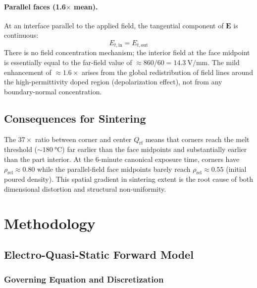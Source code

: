 \documentclass[5p,times]{elsarticle}
\newcommand{\Qrf}{Q_{\mathrm{rf}}}
\newcommand{\rhorel}{\rho_{\mathrm{rel}}}
\newcommand{\vect}[1]{\boldsymbol{#1}}
\begin{document}
\paragraph{Parallel faces (1.6$\times$ mean).}
At an interface parallel to the applied field, the tangential component
of $\vect{E}$ is continuous:
\begin{equation}
  E_{t,\mathrm{in}} = E_{t,\mathrm{out}}
  \label{eq:tangential_E_continuity}
\end{equation}
There is no field concentration mechanism; the interior field at the
face midpoint is essentially equal to the far-field value of
$\approx 860/60 = \SI{14.3}{\volt\per\milli\meter}$.  The mild
enhancement of $\approx 1.6\times$ arises from the global redistribution
of field lines around the high-permittivity doped region
(depolarization effect), not from any boundary-normal concentration.

\subsection{Consequences for Sintering}

The $37\times$ ratio between corner and center $\Qrf$ means that
corners reach the melt threshold ($\sim\SI{180}{\celsius}$) far earlier
than the face midpoints and substantially earlier than the part
interior.  At the 6-minute canonical exposure time, corners have
$\rhorel \approx 0.80$ while the parallel-field face midpoints barely
reach $\rhorel \approx 0.55$ (initial poured density).  This spatial
gradient in sintering extent is the root cause of both dimensional
distortion and structural non-uniformity.

\FloatBarrier
\section{Methodology}
\label{sec:methodology}

\subsection{Electro-Quasi-Static Forward Model}
\label{sec:eqs_model}

\subsubsection{Governing Equation and Discretization}
\end{document}
